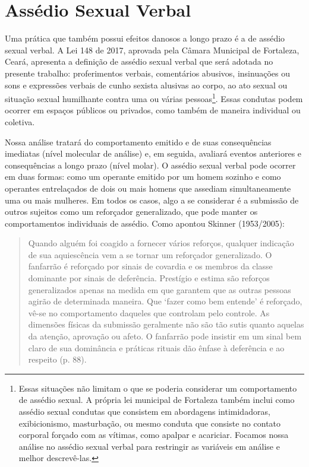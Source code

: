 \section{Assédio Sexual Verbal}

Uma prática que também possui efeitos danosos a longo prazo é a de assédio sexual verbal. A Lei 148 de 2017, aprovada pela Câmara Municipal de Fortaleza, Ceará, apresenta a definição de assédio sexual verbal que será adotada no presente trabalho: proferimentos verbais, comentários abusivos, insinuações ou sons e expressões verbais de cunho sexista alusivas ao corpo, ao ato sexual ou situação sexual humilhante contra uma ou várias pessoas\footnote{Essas situações não limitam o que se poderia considerar um comportamento de assédio sexual. A própria lei municipal de Fortaleza também inclui como assédio sexual condutas que consistem em abordagens intimidadoras, exibicionismo, masturbação, ou mesmo conduta que consiste no contato corporal forçado com as vítimas, como apalpar e acariciar. Focamos nossa análise no assédio sexual verbal para restringir as variáveis em análise e melhor descrevê-las.}. Essas condutas podem ocorrer em espaços públicos ou privados, como também de maneira individual ou coletiva.

Nossa análise tratará do comportamento emitido e de suas consequências imediatas (nível molecular de análise) e, em seguida, avaliará eventos anteriores e consequências a longo prazo (nível molar). O assédio sexual verbal pode ocorrer em duas formas: como um operante emitido por um homem sozinho e como operantes entrelaçados de dois ou mais homens que assediam simultaneamente uma ou mais mulheres. Em todos os casos, algo a se considerar é a submissão de outros sujeitos como um reforçador generalizado, que pode manter os comportamentos individuais de assédio. Como apontou Skinner (1953/2005):

\begin{quote}
    Quando alguém foi coagido a fornecer vários reforços, qualquer indicação de sua aquiescência vem a se tornar um reforçador generalizado. O fanfarrão é reforçado por sinais de covardia e os membros da classe dominante por sinais de deferência. Prestígio e estima são reforços generalizados apenas na medida em que garantem que as outras pessoas agirão de determinada maneira. Que ‘fazer como bem entende’ é reforçado, vê-se no comportamento daqueles que controlam pelo controle. As dimensões físicas da submissão geralmente não são tão sutis quanto aquelas da atenção, aprovação ou afeto. O fanfarrão pode insistir em um sinal bem claro de sua dominância e práticas rituais dão ênfase à deferência e ao respeito (p. 88).
\end{quote}

